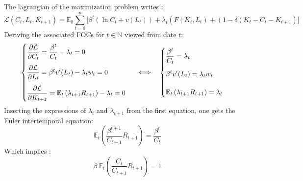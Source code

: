 \documentclass[12pt]{article}
\begin{document}
\subsection{}
The lagrangian of the maximization problem writes :
\begin{equation*}
    \mathcal{L}(C_t,L_t,K_{t+1}) = \mathbb{E}_0\sum_{t=0}^{\infty} \Big[ \beta^t (\ln C_t + v(L_t)) + \lambda_t (F(K_t, L_t) + (1 - \delta)K_t - C_t - K_{t+1}) \Big]
\end{equation*}
Deriving the associated FOCs for $t \in \mathbb{N}$ viewed from date $t$:
\[
\begin{cases}
    \begin{array}{@{}l}
        \displaystyle \frac{\partial \mathcal{L}}{\partial C_t} =  \frac{\beta^t}{C_t} - \lambda_t = 0\\[12pt]
        \displaystyle \frac{\partial \mathcal{L}}{\partial L_t} = \beta^t v'(L_t) - \lambda_t w_t = 0\\[12pt]
        \displaystyle \frac{\partial \mathcal{L}}{\partial K_{t+1}} = \mathbb{E}_t \left( \lambda_{t+1} R_{t+1} \right) - \lambda_t = 0\\
    \end{array}
\end{cases}
\Longleftrightarrow \quad
\begin{cases}
    \begin{array}{@{}l}
        \displaystyle \frac{\beta^t}{C_t} = \lambda_t\\[12pt]
        \displaystyle \beta^t v'(L_t) = \lambda_t w_t\\[12pt]
        \displaystyle \mathbb{E}_t \left( \lambda_{t+1} R_{t+1} \right) = \lambda_t\\
    \end{array}
\end{cases}
\]
Inserting the expressions of $\lambda_t$ and $\lambda_{t+1}$ from the first equation, one gets the Euler intertemporal equation: 
\begin{equation*}
    \mathbb{E}_t \left( \frac{\beta^{t+1}}{C_{t+1}} R_{t+1} \right) = \frac{\beta^t}{C_t}
\end{equation*}
Which implies : 
\begin{equation*}
   \beta~\mathbb{E}_t \left( \frac{C_t}{C_{t+1}} R_{t+1} \right) = 1
\end{equation*}
\end{document}
